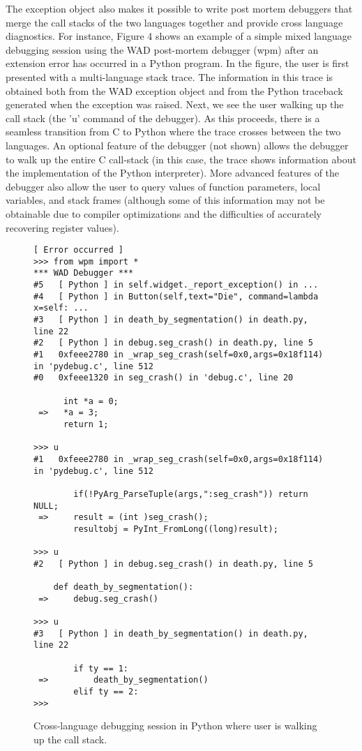 The exception object also makes it possible to write post mortem
debuggers that merge the call stacks of the two languages together and
provide cross language diagnostics.  For instance, Figure 4 shows an
example of a simple mixed language debugging session using the WAD
post-mortem debugger (wpm) after an extension error has occurred in a
Python program.  In the figure, the user is first presented with a
multi-language stack trace.  The information in this trace is obtained
both from the WAD exception object and from the Python traceback
generated when the exception was raised. Next, we see the user walking
up the call stack (the 'u' command of the debugger).  As this
proceeds, there is a seamless transition from C to Python where the
trace crosses between the two languages.  An optional feature of the
debugger (not shown) allows the debugger to walk up the entire C
call-stack (in this case, the trace shows information about the
implementation of the Python interpreter).  More advanced features of
the debugger also allow the user to query values of function
parameters, local variables, and stack frames (although some of this
information may not be obtainable due to compiler optimizations and the
difficulties of accurately recovering register values).

\begin{figure*}[t]
{\small
\begin{verbatim}
[ Error occurred ]
>>> from wpm import *
*** WAD Debugger ***
#5   [ Python ] in self.widget._report_exception() in ...
#4   [ Python ] in Button(self,text="Die", command=lambda x=self: ...
#3   [ Python ] in death_by_segmentation() in death.py, line 22
#2   [ Python ] in debug.seg_crash() in death.py, line 5
#1   0xfeee2780 in _wrap_seg_crash(self=0x0,args=0x18f114) in 'pydebug.c', line 512
#0   0xfeee1320 in seg_crash() in 'debug.c', line 20

      int *a = 0;
 =>   *a = 3;
      return 1;

>>> u
#1   0xfeee2780 in _wrap_seg_crash(self=0x0,args=0x18f114) in 'pydebug.c', line 512
        
        if(!PyArg_ParseTuple(args,":seg_crash")) return NULL;
 =>     result = (int )seg_crash();
        resultobj = PyInt_FromLong((long)result);

>>> u
#2   [ Python ] in debug.seg_crash() in death.py, line 5
    
    def death_by_segmentation():
 =>     debug.seg_crash()
    
>>> u
#3   [ Python ] in death_by_segmentation() in death.py, line 22

        if ty == 1:
 =>         death_by_segmentation()
        elif ty == 2:
>>> 
\end{verbatim}
}
\caption{Cross-language debugging session in Python where user is walking up the call stack.}
\end{figure*}


